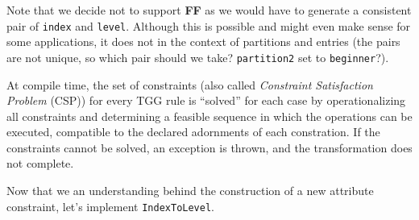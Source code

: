 Note that we decide not to support \textbf{FF} as we would have to generate a consistent pair of \texttt{index} and \texttt{level}. Although this is possible
and might even make sense for some applications, it does not in the context of partitions and entries (the pairs are not unique, so which pair should we
take? \texttt{partition2} set to \texttt{beginner}?).

At compile time, the set of constraints (also called \emph{Constraint Satisfaction Problem} (CSP)) for every TGG rule is ``solved'' for each case by
operationalizing all constraints and determining a feasible sequence in which the operations can be executed, compatible to the declared adornments of each
constration. If the constraints cannot be solved, an exception is thrown, and the transformation does not complete.

Now that we an understanding behind the construction of a new attribute constraint, let's implement \texttt{IndexToLevel}.

